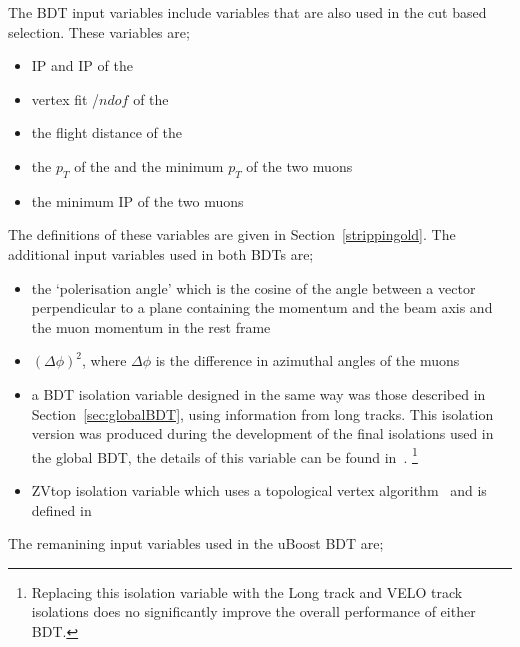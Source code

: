 The BDT input variables include variables that are also used in the cut based selection. These variables are;
\begin{itemize}
\item IP and IP \chisqd of the \bs
\item vertex fit \chisqd/$ndof$ of the \bs 
\item the flight distance of the \bs
\item the $p_T$ of the \bs and the minimum $p_T$ of the two muons
\item the minimum IP \chisqd of the two muons
\end{itemize}
The definitions of these variables are given in Section~\ref{strippingold}. The additional input variables used in both BDTs are; %
\begin{itemize}
\item  the `polerisation angle' which is the cosine of the angle between a vector perpendicular to a plane containing the \bs momentum and the beam axis and the muon momentum in the \bs rest frame 
\item $(\Delta \phi)^{2}$, where $\Delta \phi$ is the difference in azimuthal angles of the muons
\item a BDT isolation variable designed in the same way was those described in Section~\ref{sec:globalBDT}, using information from long tracks. This isolation version was produced during the development of the final isolations used in the global BDT, the details of this variable can be found in~\cite{Archilli:1970886}. \footnote{Replacing this isolation variable with the Long track and VELO track isolations does no significantly improve the overall performance of either BDT.}
\item ZVtop isolation variable which uses a topological vertex algorithm~\cite{Jackson:1996sy} and is defined in~\cite{Morda:2120795}
\end{itemize}
The remanining input variables used in the uBoost BDT are;
